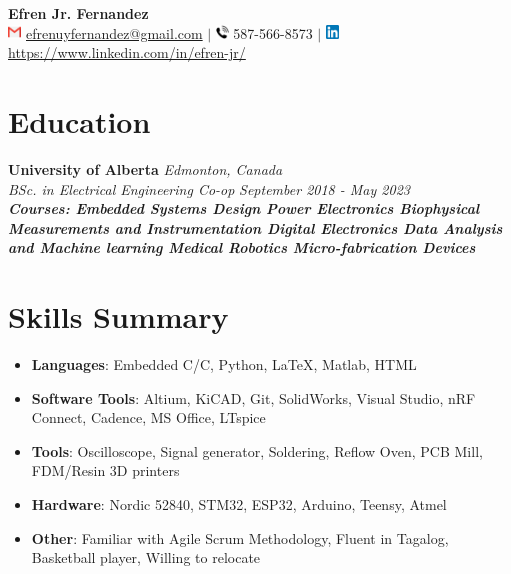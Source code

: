 \documentclass[a4paper,20pt]{article}
\newcommand{\resumeItem}[2]{
  \item\small{
    \textbf{#1}{: #2 \vspace{-2pt}}
  }
}
\newcommand{\resumeSubItem}[2]{\resumeItem{#1}{#2}\vspace{-3pt}}
\newcommand{\resumeSubHeadingListStart}{\begin{itemize}[leftmargin=*]}
\newcommand{\resumeSubHeadingListEnd}{\end{itemize}}
\begin{document}
\begin{center}
    {\huge \textbf{Efren Jr. Fernandez}} \vspace{5pt}\\ %
    \includegraphics[height = 10pt]{images/Gmail_icon_(2020).png} \href{mailto:}{efrenuyfernandez@gmail.com} $\vert$
    \includegraphics[height = 10pt]{phone.png}
    587-566-8573 $\vert$
    \includegraphics[height = 10pt]{images/linkedin_logo.png} \href{https://www.linkedin.com/in/efren-jr/}{https://www.linkedin.com/in/efren-jr/}  
    
\end{center}


\section{Education}
    \vspace{-1pt}
        \textbf{University of Alberta} \hspace{10.7cm}
        \textit{Edmonton, Canada} \\
        \textit{BSc. in Electrical Engineering Co-op}\hspace{8.25 cm}
        \textit{September 2018 - May 2023} \\
        \vspace{-10pt}
      {\scriptsize \textit{ \footnotesize{\newline{}\textbf{Courses: Embedded Systems Design \textbullet{} Power Electronics \textbullet{} Biophysical Measurements and Instrumentation \textbullet{} Digital Electronics \textbullet{} Data Analysis and Machine learning \textbullet{} Medical Robotics \textbullet{} Micro-fabrication Devices } }}}

\section{Skills Summary}
	\resumeSubHeadingListStart
	\resumeSubItem{Languages}{\hspace{3em}Embedded C/C, Python, LaTeX, Matlab, HTML}
	\resumeSubItem{Software Tools}{\hspace{0.8em}Altium, KiCAD, Git, SolidWorks, Visual Studio, nRF Connect, Cadence, MS Office, LTspice}
	\resumeSubItem{Tools}{\hspace{5.5em}Oscilloscope, Signal generator, Soldering, Reflow Oven, PCB Mill, FDM/Resin 3D printers}
    \resumeSubItem{Hardware}{\hspace{3.3em}Nordic 52840, STM32, ESP32, Arduino, Teensy, Atmel}
    \resumeSubItem{Other}{\hspace{5.3em}Familiar with Agile Scrum Methodology, Fluent in Tagalog, Basketball player, Willing to relocate}
    \resumeSubHeadingListEnd
\vspace{-3pt}
\end{document}
